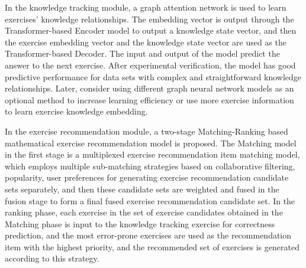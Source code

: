 In the knowledge tracking module, a graph attention network is used to learn exercises' knowledge relationships. The embedding vector is output through the Transformer-based Encoder model to output a knowledge state vector, and then the exercise embedding vector and the knowledge state vector are used as the Transformer-based Decoder. The input and output of the model predict the answer to the next exercise. After experimental verification, the model has good predictive performance for data sets with complex and straightforward knowledge relationships. Later, consider using different graph neural network models as an optional method to increase learning efficiency or use more exercise information to learn exercise knowledge embedding.


In the exercise recommendation module, a two-stage Matching-Ranking based mathematical exercise recommendation model is proposed. The Matching model in the first stage is a multiplexed exercise recommendation item matching model, which employs multiple sub-matching strategies based on collaborative filtering, popularity, user preferences for generating exercise recommendation candidate sets separately, and then these candidate sets are weighted and fused in the fusion stage to form a final fused exercise recommendation candidate set. In the ranking phase, each exercise in the set of exercise candidates obtained in the Matching phase is input to the knowledge tracking exercise for correctness prediction, and the most error-prone exercises are used as the recommendation item with the highest priority, and the recommended set of exercises is generated according to this strategy.


